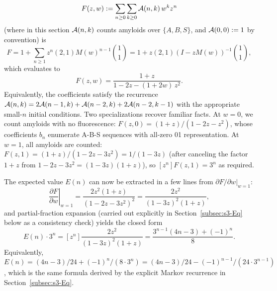 \documentclass[referee,lineno,pdflatex,sn-mathphys-ay]{sn-jnl}
\newcommand{\cA}{ {\cal A} }
\begin{document}
\[
F(z, w) := \sum_{n \ge 0} \sum_{k \ge 0} \cA(n, k)\, w^k z^n
\]
(where in this section $\cA(n,k)$ counts amyloids over $\{A,B,S\}$, and $\cA(0, 0) := 1$ by convention) is
\[
F = 1 + \sum_{n \ge 1} z^n (2,1)M(w)^{n-1}\binom{1}{1}
=1 + z(2, 1) (I - z M(w))^{-1} \binom{1}{1},
\]
which evaluates to
\begin{equation}\label{eq:s3-bivar-gf}
F(z, w) = \frac{1 + z}{1 - 2z - (1 + 2w)\,z^2}.
\end{equation}
Equivalently, the coefficients satisfy the recurrence $\cA(n, k) = 2\cA(n-1, k) + \cA(n-2, k) + 2\cA(n-2, k-1)$ with the appropriate small-$n$ initial conditions. Two specializations recover familiar facts. At $w = 0$, we count amyloids with no fluorescence: $F(z, 0) = (1+z)/(1 - 2z - z^2)$, whose coefficients $b_n$ enumerate A-B-S sequences with all-zero 01 representation. At $w = 1$, all amyloids are counted: $F(z, 1) = (1+z)/(1 - 2z - 3z^2) = 1/(1 - 3z)$ (after canceling the factor $1+z$ from $1 - 2z - 3z^2 = (1 - 3z)(1 + z)$), so $[z^n] F(z, 1) = 3^n$ as required.

The expected value $E(n)$ can now be extracted in a few lines from $\partial F / \partial w \big|_{w=1}$:
\[
\left.\frac{\partial F}{\partial w}\right|_{w = 1} = \frac{2 z^2 (1+z)}{(1 - 2z - 3z^2)^2} = \frac{2 z^2}{(1 - 3z)^2 (1 + z)},
\]
and partial-fraction expansion (carried out explicitly in Section~\ref{subsec:s3-Eq} below as a consistency check) yields the closed form
\[
E(n) \cdot 3^n = [z^n] \frac{2 z^2}{(1 - 3z)^2 (1 + z)} = \frac{3^{n-1}(4n - 3) + (-1)^n}{8}.
\]
Equivalently, $E(n) = (4n - 3)/24 + (-1)^n / (8 \cdot 3^n) = (4n-3)/24 - (-1)^{n-1}/(24 \cdot 3^{n-1})$, which is the same formula derived by the explicit Markov recurrence in Section~\ref{subsec:s3-Eq}.
\end{document}
